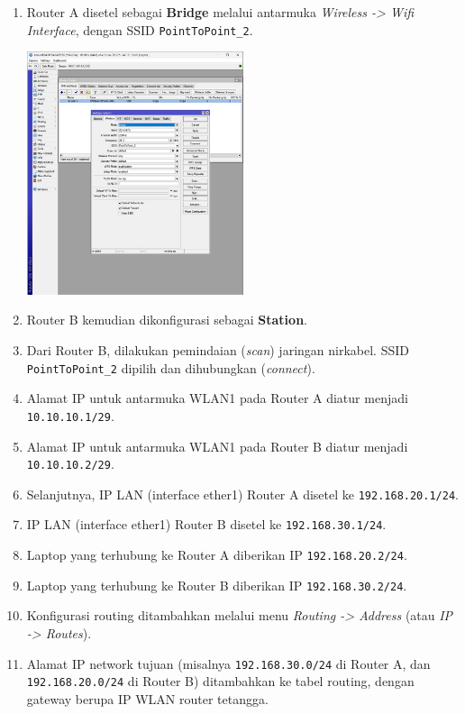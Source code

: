\begin{enumerate}
    \item Router A disetel sebagai \textbf{Bridge} melalui antarmuka \textit{Wireless -> Wifi Interface}, dengan SSID \texttt{PointToPoint\_2}.
    \begin{center}
        \includegraphics[width=0.5\textwidth]{img/bridge.jpg}
    \end{center}
    \item Router B kemudian dikonfigurasi sebagai \textbf{Station}.
    \item Dari Router B, dilakukan pemindaian (\textit{scan}) jaringan nirkabel. SSID \texttt{PointToPoint\_2} dipilih dan dihubungkan (\textit{connect}).
    \item Alamat IP untuk antarmuka WLAN1 pada Router A diatur menjadi \texttt{10.10.10.1/29}.
    \item Alamat IP untuk antarmuka WLAN1 pada Router B diatur menjadi \texttt{10.10.10.2/29}.
    \item Selanjutnya, IP LAN (interface ether1) Router A disetel ke \texttt{192.168.20.1/24}.
    \item IP LAN (interface ether1) Router B disetel ke \texttt{192.168.30.1/24}.
    \item Laptop yang terhubung ke Router A diberikan IP \texttt{192.168.20.2/24}.
    \item Laptop yang terhubung ke Router B diberikan IP \texttt{192.168.30.2/24}.
    \item Konfigurasi routing ditambahkan melalui menu \textit{Routing -> Address} (atau \textit{IP -> Routes}).
    \item Alamat IP network tujuan (misalnya \texttt{192.168.30.0/24} di Router A, dan \texttt{192.168.20.0/24} di Router B) ditambahkan ke tabel routing, dengan gateway berupa IP WLAN router tetangga.

\end{enumerate}
